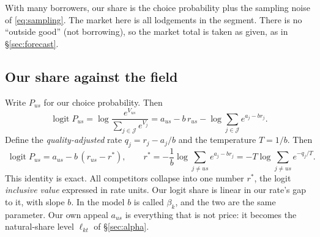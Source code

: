 \documentclass[11pt,a4paper]{article}
\theoremstyle{remark}
\newcommand{\logit}{\operatorname{logit}}
\newcommand{\rs}{r^{*}}
\begin{document}
With many borrowers, our share is the choice probability plus the sampling noise of
\eqref{eq:sampling}. The market here is all lodgements in the segment. There is no
``outside good'' (not borrowing), so the market total is taken as given, as in \S\ref{sec:forecast}.

\subsection{Our share against the field}
Write $P_{us}$ for our choice probability. Then
\[
\logit P_{us}=\log\frac{e^{V_{us}}}{\sum_{j\in\mathcal J}e^{V_j}}
= a_{us}-b\,r_{us}-\log\sum_{j\in\mathcal J}e^{a_j-br_j}.
\]
Define the \emph{quality-adjusted} rate $q_j=r_j-a_j/b$ and the temperature $T=1/b$. Then
\begin{equation}\label{eq:binary}
\boxed{\;\logit P_{us}=a_{us}-b\,(r_{us}-\rs),\qquad
\rs=-\frac1b\log\sum_{j\ne us}e^{a_j-br_j}=-T\log\sum_{j\ne us}e^{-q_j/T}.\;}
\end{equation}
This identity is exact. All competitors collapse into one number $\rs$, the logit
\emph{inclusive value} expressed in rate units. Our logit share is linear in our rate's gap to it, with
slope $b$. In the model $b$ is called $\beta_k$, and the two are the same parameter. Our own appeal
$a_{us}$ is everything that is not price: it becomes the natural-share level $\ell_{kt}$ of \S\ref{sec:alpha}.
\end{document}
